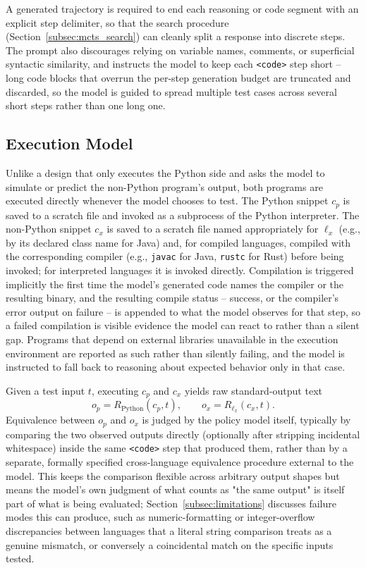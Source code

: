 A generated trajectory is required to end each reasoning or code segment with
an explicit step delimiter, so that the search procedure
(Section~\ref{subsec:mcts_search}) can cleanly split a response into discrete
steps. The prompt also discourages relying on variable names, comments, or
superficial syntactic similarity, and instructs the model to keep each
\texttt{<code>} step short -- long code blocks that overrun the per-step
generation budget are truncated and discarded, so the model is guided to
spread multiple test cases across several short steps rather than one long
one.

\subsection{Execution Model}
\label{subsec:execution_model}

Unlike a design that only executes the Python side and asks the model to
simulate or predict the non-Python program's output, both programs are
executed directly whenever the model chooses to test. The Python snippet
$c_p$ is saved to a scratch file and invoked as a subprocess of the Python
interpreter. The non-Python snippet $c_x$ is saved to a scratch file named
appropriately for $\ell_x$ (e.g., by its declared class name for Java) and,
for compiled languages, compiled with the corresponding compiler (e.g.,
\texttt{javac} for Java, \texttt{rustc} for Rust) before being invoked; for
interpreted languages it is invoked directly. Compilation is triggered
implicitly the first time the model's generated code names the compiler or
the resulting binary, and the resulting compile status -- success, or the
compiler's error output on failure -- is appended to what the model observes
for that step, so a failed compilation is visible evidence the model can
react to rather than a silent gap. Programs that depend on external libraries
unavailable in the execution environment are reported as such rather than
silently failing, and the model is instructed to fall back to reasoning about
expected behavior only in that case.

Given a test input $t$, executing $c_p$ and $c_x$ yields raw standard-output
text
\[
    o_p = R_{\text{Python}}(c_p,t), \qquad o_x = R_{\ell_x}(c_x,t).
\]
Equivalence between $o_p$ and $o_x$ is judged by the policy model itself,
typically by comparing the two observed outputs directly (optionally after
stripping incidental whitespace) inside the same \texttt{<code>} step that
produced them, rather than by a separate, formally specified cross-language
equivalence procedure external to the model. This keeps the comparison
flexible across arbitrary output shapes but means the model's own judgment of
what counts as "the same output" is itself part of what is being evaluated;
Section~\ref{subsec:limitations} discusses failure modes this can produce,
such as numeric-formatting or integer-overflow discrepancies between
languages that a literal string comparison treats as a genuine mismatch, or
conversely a coincidental match on the specific inputs tested.

